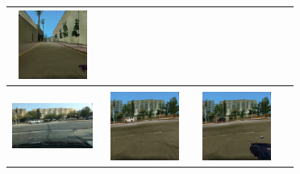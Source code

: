\documentclass{VUMIFPSbakalaurinis}
\begin{document}
\begin{table}[H]
{\begin{tabular}{|c|c|c|c|}
            \includegraphics[width=100,height=85]{img/mspccar/7cf55c3d-9cbeb7c6} \\
            \hline
            \\
            \includegraphics[width=100,height=85]{img/original/7cf55c3d-19556e52} & 
            \includegraphics[width=100,height=85]{img/mspcv2/7cf55c3d-19556e52} & 
            \includegraphics[width=100,height=85]{img/mspccar/7cf55c3d-19556e52} \\

\end{tabular}}
\end{table}
\end{document}
